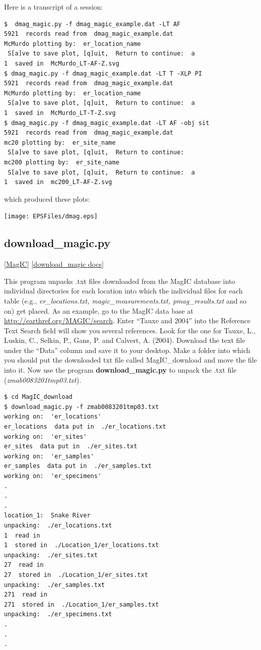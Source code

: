 \documentclass[11pt]{book}
\begin{document}
{{{Here is a transcript of a session:

\begin{verbatim}
$  dmag_magic.py -f dmag_magic_example.dat -LT AF
5921  records read from  dmag_magic_example.dat
McMurdo plotting by:  er_location_name
 S[a]ve to save plot, [q]uit,  Return to continue:  a
1  saved in  McMurdo_LT-AF-Z.svg
$ dmag_magic.py -f dmag_magic_example.dat -LT T -XLP PI
5921  records read from  dmag_magic_example.dat
McMurdo plotting by:  er_location_name
 S[a]ve to save plot, [q]uit,  Return to continue:  a
1  saved in  McMurdo_LT-T-Z.svg
$ dmag_magic.py -f dmag_magic_example.dat -LT AF -obj sit
5921  records read from  dmag_magic_example.dat
mc20 plotting by:  er_site_name
 S[a]ve to save plot, [q]uit,  Return to continue:
mc200 plotting by:  er_site_name
 S[a]ve to save plot, [q]uit,  Return to continue:  a
1  saved in  mc200_LT-AF-Z.svg

\end{verbatim}

\noindent which produced these plots:

\texttt{[image: EPSFiles/dmag.eps]}


 \subsection{download\_magic.py} [\href{http://earthref.org/MagIC}{MagIC}]
\href{https://github.com/PmagPy/PmagPy/blob/master/programs/download_magic.py}{[download\_magic docs]}

 This program unpacks .txt files downloaded from the MagIC database into individual directories for each location into which the individual files for each table (e.g., {\it er\_locations.txt, magic\_measurements.txt, pmag\_results.txt} and so on) get placed.   As an example, go to the MagIC data base at \url{http://earthref.org/MAGIC/search}.  Enter ``Tauxe and 2004'' into the Reference Text Search field will show you several references.   Look for the one for Tauxe, L., Luskin, C., Selkin, P., Gans, P. and Calvert, A. (2004). \nocite{tauxe04b}  Download the  text file under the ``Data'' column and save it to your desktop.   Make a   folder into which  you should put the downloaded txt file called MagIC\_download and move the file into it.  Now use the program {\bf download\_magic.py} to unpack the .txt file ({\it zmab0083201tmp03.txt}).

 \begin{verbatim}
$ cd MagIC_download
$ download_magic.py -f zmab0083201tmp03.txt
working on:  'er_locations'
er_locations  data put in  ./er_locations.txt
working on:  'er_sites'
er_sites  data put in  ./er_sites.txt
working on:  'er_samples'
er_samples  data put in  ./er_samples.txt
working on:  'er_specimens'
.
.
.
location_1:  Snake River
unpacking:  ./er_locations.txt
1  read in
1  stored in  ./Location_1/er_locations.txt
unpacking:  ./er_sites.txt
27  read in
27  stored in  ./Location_1/er_sites.txt
unpacking:  ./er_samples.txt
271  read in
271  stored in  ./Location_1/er_samples.txt
unpacking:  ./er_specimens.txt
.
.
.
\end{verbatim}

}}}
\end{document}
